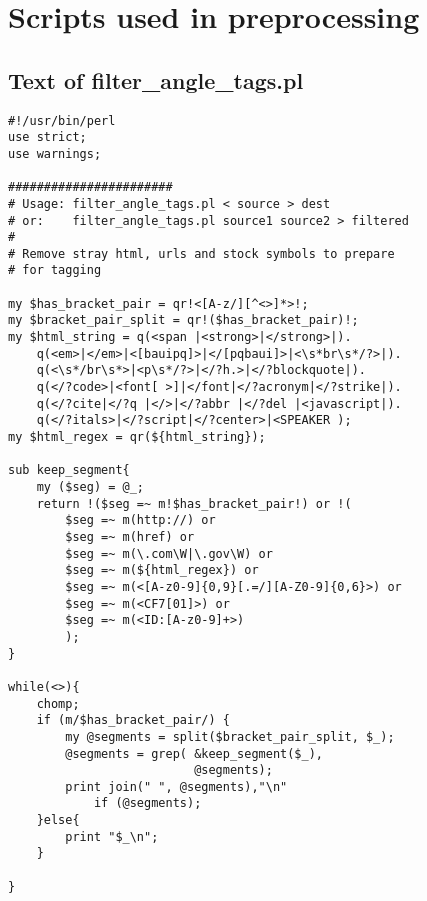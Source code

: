 \documentclass[eric_thesis.tex]{subfiles}
\begin{document}
\appendix
\chapter{Scripts used in preprocessing}
\section{Text of filter\_angle\_tags.pl}
\label{app:filterangletags}
\lstset{language=Perl}
\begin{lstlisting}
#!/usr/bin/perl
use strict;
use warnings;

#######################
# Usage: filter_angle_tags.pl < source > dest
# or:    filter_angle_tags.pl source1 source2 > filtered
#
# Remove stray html, urls and stock symbols to prepare
# for tagging

my $has_bracket_pair = qr!<[A-z/][^<>]*>!;
my $bracket_pair_split = qr!($has_bracket_pair)!;
my $html_string = q(<span |<strong>|</strong>|).
    q(<em>|</em>|<[bauipq]>|</[pqbaui]>|<\s*br\s*/?>|).
    q(<\s*/br\s*>|<p\s*/?>|</?h.>|</?blockquote|).
    q(</?code>|<font[ >]|</font|</?acronym|</?strike|).
    q(</?cite|</?q |</>|</?abbr |</?del |<javascript|).
    q(</?itals>|</?script|</?center>|<SPEAKER );
my $html_regex = qr(${html_string});

sub keep_segment{
    my ($seg) = @_;
    return !($seg =~ m!$has_bracket_pair!) or !(
        $seg =~ m(http://) or
        $seg =~ m(href) or
        $seg =~ m(\.com\W|\.gov\W) or
        $seg =~ m(${html_regex}) or
        $seg =~ m(<[A-z0-9]{0,9}[.=/][A-Z0-9]{0,6}>) or
        $seg =~ m(<CF7[01]>) or
        $seg =~ m(<ID:[A-z0-9]+>)
        );
}

while(<>){
    chomp;
    if (m/$has_bracket_pair/) {
        my @segments = split($bracket_pair_split, $_);
        @segments = grep( &keep_segment($_), 
                          @segments);
        print join(" ", @segments),"\n" 
            if (@segments);
    }else{
        print "$_\n";
    }

}
\end{lstlisting}
\end{document}
